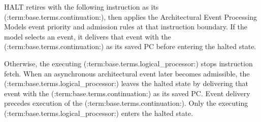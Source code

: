 HALT retires with the following instruction as its (:term:base.terms.continuation:), then applies the Architectural Event Processing
Model\textquotesingle{}s event priority and admission rules at that instruction boundary. If the model selects an event, it
delivers that event with the (:term:base.terms.continuation:) as its saved PC before entering the halted state.

Otherwise, the executing (:term:base.terms.logical_processor:) stops instruction fetch. When an asynchronous architectural event later
becomes admissible, the (:term:base.terms.logical_processor:) leaves the halted state by delivering that event with the (:term:base.terms.continuation:) as
its saved PC. Event delivery precedes execution of the (:term:base.terms.continuation:). Only the executing (:term:base.terms.logical_processor:) enters
the halted state.
